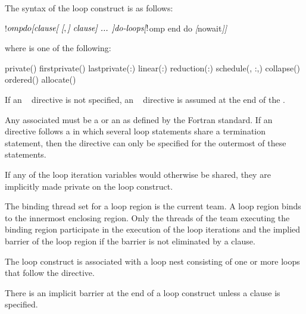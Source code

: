 \begin{fortranspecific}
The syntax of the loop construct is as follows:

\begin{ompfPragma}
!$omp do \plc{[clause[ [},\plc{] clause] ... ]}
   \plc{do-loops}
\textsl{[}!$omp end do \textsl{[}nowait\textsl{]]}
\end{ompfPragma}

where  is one of the following:

\begin{indentedcodelist}
private()
firstprivate()
lastprivate(\plc{[ lastprivate-modifier}:\plc{] list})
linear(\plc{list[ }:\plc{ linear-step]})
reduction(:)
schedule(\plc{[modifier [}, \plc{modifier]}:\plc{]kind[},\plc{ chunk_size]})
collapse()
ordered\plc{[}()\plc{]}
allocate(\plc{[allocator: ]})
\end{indentedcodelist}

If an ~ directive is not specified, an ~ directive is assumed at the end of the
.

Any associated  must be a  or an
 as defined by the Fortran standard. If
an ~ directive follows a  in
which several loop statements share a  termination statement,
then the directive can only be specified for the outermost of these
 statements.

If any of the loop iteration variables would otherwise be shared, they are implicitly
made private on the loop construct.
\end{fortranspecific}


\binding
The binding thread set for a loop region is the current team. A loop region binds to the
innermost enclosing  region. Only the threads of the team executing the
binding  region participate in the execution of the loop iterations and the
implied barrier of the loop region if the barrier is not eliminated by a  clause.

\descr
The loop construct is associated with a loop nest consisting of one or more loops that
follow the directive.

There is an implicit barrier at the end of a loop construct unless a  clause is
specified.

